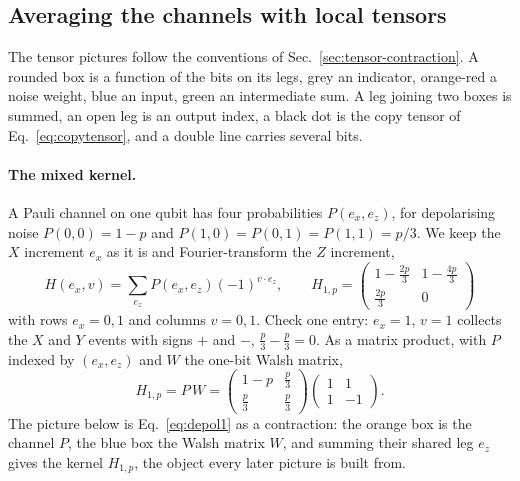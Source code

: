 \subsection{Averaging the channels with local tensors}\label{app:response-average}
The tensor pictures follow the conventions of Sec.~\ref{sec:tensor-contraction}. A rounded box is a function of the bits on its legs, grey an indicator, orange-red a noise weight, blue an input, green an intermediate sum. A leg joining two boxes is summed, an open leg is an output index, a black dot is the copy tensor of Eq.~\eqref{eq:copytensor}, and a double line carries several bits.


\paragraph{The mixed kernel.} A Pauli channel on one qubit has four probabilities $P(e_x,e_z)$, for depolarising noise $P(0,0)=1-p$ and $P(1,0)=P(0,1)=P(1,1)=p/3$. We keep the $X$ increment $e_x$ as it is and Fourier-transform the $Z$ increment,
\begin{equation}
 H(e_x,v)=\sum_{e_z}P(e_x,e_z)(-1)^{v\cdot e_z},\qquad
 H_{1,p}=\begin{pmatrix}1-\tfrac{2p}{3}&1-\tfrac{4p}{3}\\[.3ex]\tfrac{2p}{3}&0\end{pmatrix}
 \label{eq:mixed}
\end{equation}
with rows $e_x=0,1$ and columns $v=0,1$. Check one entry: $e_x=1$, $v=1$ collects the $X$ and $Y$ events with signs $+$ and $-$, $\tfrac p3-\tfrac p3=0$. As a matrix product, with $P$ indexed by $(e_x,e_z)$ and $W$ the one-bit Walsh matrix,
\begin{equation}
 H_{1,p}=P\,W=\begin{pmatrix}1-p&\tfrac p3\\[.2ex]\tfrac p3&\tfrac p3\end{pmatrix}\begin{pmatrix}1&1\\1&-1\end{pmatrix} .
 \label{eq:depol1}
\end{equation}
The picture below is Eq.~\eqref{eq:depol1} as a contraction: the orange box is the channel $P$, the blue box the Walsh matrix $W$, and summing their shared leg $e_z$ gives the kernel $H_{1,p}$, the object every later picture is built from.
\begin{center}
\end{center}
